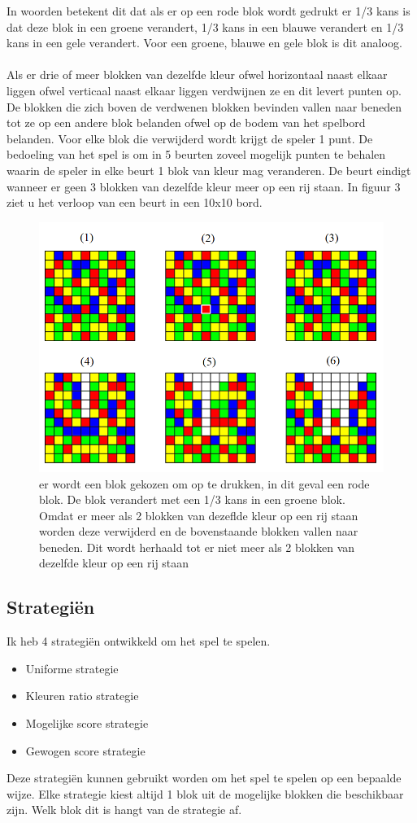 \documentclass[12pt,a4paper,oneside]{book}
\theoremstyle{definition}
\begin{document}
In woorden betekent dit dat als er op een rode blok wordt gedrukt er 1/3 kans is dat deze blok in een groene verandert, 1/3 kans in een blauwe verandert en 1/3 kans in een gele verandert. Voor een groene, blauwe en gele blok is dit analoog.
\\\\
Als er drie of meer blokken van dezelfde kleur ofwel horizontaal naast elkaar liggen ofwel verticaal naast elkaar liggen verdwijnen ze en dit levert punten op. De blokken die zich boven de verdwenen blokken bevinden vallen naar beneden tot ze op een andere blok belanden ofwel op de bodem van het spelbord belanden. Voor elke blok die verwijderd wordt krijgt de speler 1 punt. De bedoeling van het spel is om in 5 beurten zoveel mogelijk punten te behalen waarin de speler in elke beurt 1 blok van kleur mag veranderen. De beurt eindigt wanneer er geen 3 blokken van dezelfde kleur meer op een rij staan. In figuur 3 ziet u het verloop van een beurt in een 10x10 bord.
\begin{figure}
	\centering
	\includegraphics[height=80truemm]{turn}
	\caption{er wordt een blok gekozen om op te drukken, in dit geval een rode blok. De blok verandert met een 1/3 kans in een groene blok. Omdat er meer als 2 blokken van dezeflde kleur op een rij staan worden deze verwijderd en de bovenstaande blokken vallen naar beneden. Dit wordt herhaald tot er niet meer als 2 blokken van dezelfde kleur op een rij staan}
	\label{figure:initialboard}
\end{figure}
\subsection{Strategi\"{e}n}
Ik heb 4 strategiën ontwikkeld om het spel te spelen.
\begin{itemize}
	\item Uniforme strategie
	\item Kleuren ratio strategie
	\item Mogelijke score strategie
	\item Gewogen score strategie
\end{itemize}
Deze strategiën kunnen gebruikt worden om het spel te spelen op een bepaalde wijze. Elke strategie kiest altijd 1 blok uit de mogelijke blokken die beschikbaar zijn. Welk blok dit is hangt van de strategie af.
\end{document}
